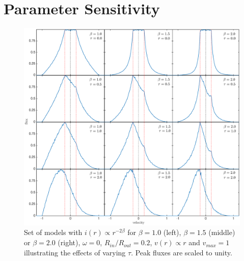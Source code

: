 \chapter{Parameter Sensitivity}\label{chp:chp4}

%
%


\label{ps}

\begin{figure}
\includegraphics[trim =87 30 6 15,clip=true,scale=0.45]{chapters/chapter4/images/params/D/newDall}
\caption{Set of models with $i(r) \propto r^{-2\beta}$ for $\beta=1.0$ (left), $\beta=1.5$ (middle) or $\beta=2.0$ (right), $\omega=0$, 
$R_{in}/R_{out}=0.2$, $v(r) \propto r$ and $v_{max}=1$ illustrating the effects of varying 
$\tau$.  Peak fluxes are scaled to unity.}
\label{bt}
\end{figure}

